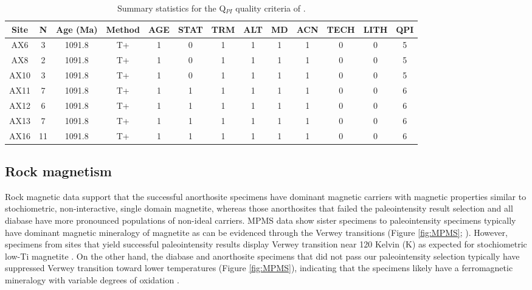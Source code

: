 \documentclass[9pt,twocolumn,twoside,lineno]{pnas-new}
\begin{document}
\begin{table}[]

\caption{\footnotesize{Summary statistics for the Q$_{PI}$ quality criteria of .}}
\centering
\begin{tabular}{ccccccccccccc}
\hline
Site & N  & Age (Ma) & Method & AGE & STAT & TRM & ALT & MD & ACN & TECH & LITH & QPI \\ \hline
AX6  & 3  & 1091.8   & T+     & 1   & 0    & 1   & 1   & 1  & 1   & 0    & 0    & 5   \\
AX8  & 2  & 1091.8   & T+     & 1   & 0    & 1   & 1   & 1  & 1   & 0    & 0    & 5   \\
AX10 & 3  & 1091.8   & T+     & 1   & 0    & 1   & 1   & 1  & 1   & 0    & 0    & 5   \\
AX11 & 7  & 1091.8   & T+     & 1   & 1    & 1   & 1   & 1  & 1   & 0    & 0    & 6   \\
AX12 & 6  & 1091.8   & T+     & 1   & 1    & 1   & 1   & 1  & 1   & 0    & 0    & 6   \\
AX13 & 7  & 1091.8   & T+     & 1   & 1    & 1   & 1   & 1  & 1   & 0    & 0    & 6   \\
AX16 & 11 & 1091.8   & T+     & 1   & 1    & 1   & 1   & 1  & 1   & 0    & 0    & 6   \\ \hline
\end{tabular}
\label{tab:QPI}
\end{table}

\subsection*{Rock magnetism}
Rock magnetic data support that the successful anorthosite specimens have dominant magnetic carriers with magnetic properties similar to stochiometric, non-interactive, single domain magnetite, whereas those anorthosites that failed the paleointensity result selection and all diabase have more pronounced populations of non-ideal carriers. MPMS data show sister specimens to paleointensity specimens typically have dominant magnetic mineralogy of magnetite as can be evidenced through the Verwey transitions (Figure \ref{fig:MPMS}; ). However, specimens from sites that yield successful paleointensity results display Verwey transition near 120 Kelvin (K) as expected for stochiometric low-Ti magnetite \cite{Ozdemir1993a}. On the other hand, the diabase and anorthosite specimens that did not pass our paleointensity selection typically have suppressed Verwey transition toward lower temperatures (Figure \ref{fig:MPMS}), indicating that the specimens likely have a ferromagnetic mineralogy with variable degrees of oxidation \cite{Ozdemir1993a}. 
 
\end{document}
